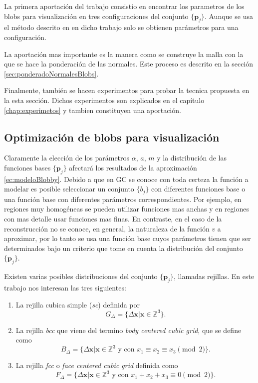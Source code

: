 La primera aportación del trabajo consistio en encontrar los parametros de los blobs para visualización en tres configuraciones del conjunto $\{ \textbf{p}_j \}$. Aunque se usa el método descrito en \cite{EdgarOptimization} en dicho trabajo solo se obtienen parámetros para una configuración.

La aportación mas importante es la manera como se construye la malla con la que se hace la ponderación de las normales. Este proceso es descrito en la sección \ref{sec:ponderadoNormalesBlobs}.

Finalmente, también se hacen experimentos para probar la tecnica propuesta en la esta sección. Dichos experimentos son explicados en el capítulo \ref{chap:experimetos} y tambien constituyen una aportación.

\subsection{Optimización de blobs para visualización}
\label{sec:optiBlobs}
Claramente la elección de los parámetros $\alpha$, $a$, $m$ y la distribución de las funciones bases $\{ \textbf{p}_j \}$ afectará los resultados de la aproximación \eqref{ec:modeloBlobby}. Debido a que en GC se conoce con toda certeza la función a modelar es posible seleccionar un conjunto $\{ b_j \}$ con diferentes funciones base o una función base con diferentes parámetros correspondientes. Por ejemplo, en regiones muy homogéneas se pueden utilizar funciones mas anchas y en regiones con mas detalle usar funciones mas finas. En contraste, en el caso de la reconstrucción no se conoce, en general, la naturaleza de la función $v$ a aproximar, por lo tanto se usa una función base cuyos parámetros tienen que ser determinados bajo un criterio que tome en cuenta la distribución del conjunto $\{ \textbf{p}_j \}$. 

Existen varias posibles distribuciones del conjunto $ \{ \textbf{p}_j \} $, llamadas rejillas. En este trabajo nos interesan las tres siguientes:

\begin{enumerate}
\item La rejilla cubica simple (\emph{sc}) definida por
\begin{equation}
 G_\Delta = \{ \Delta \textbf{x} | \textbf{x} \in \mathbb{Z}^3 \}.
 \label{ec:rejillaSC}
\end{equation}

\item La rejilla \emph{bcc} que viene del termino \emph{body centered cubic grid}, que se define como
\begin{equation}
 B_\Delta = \{ \Delta \textbf{x} | \textbf{x} \in \mathbb{Z}^3 \text{ y con } x_1 \equiv x_2 \equiv x_3 \pmod 2 \}.
 \label{ec:rejillaBCC}
\end{equation}

\item La rejilla \emph{fcc} o \emph{face centered cubic grid} definida como
\begin{equation}
 F_\Delta = \{ \Delta \textbf{x} | \textbf{x} \in \mathbb{Z}^3 \text{ y con } x_1 + x_2 + x_3 \equiv 0  \pmod 2 \}.
 \label{ec:rejillaFCC}
\end{equation}
\end{enumerate}

